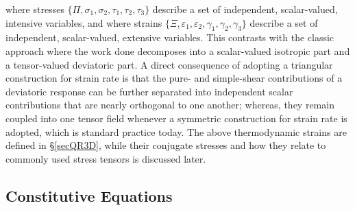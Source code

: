 where stresses $\{ \Pi , \sigma_1 , \sigma_2 , \tau_1 , \tau_2 , \tau_3  \}$ describe a set of independent, scalar-valued, intensive variables, and where strains $\{ \Xi , \varepsilon_1 , \varepsilon_2 , \gamma_1 , \gamma_2 , \gamma_3 \}$ describe a set of independent, scalar-valued, extensive variables.  This contrasts with the classic approach where the work done decomposes into a scalar-valued isotropic part and a tensor-valued deviatoric part.  A direct consequence of adopting a triangular construction for strain rate is that the pure- and simple-shear contributions of a deviatoric response can be further separated into independent scalar contributions that are nearly orthogonal to one another; whereas, they remain coupled into one tensor field whenever a symmetric construction for strain rate is adopted, which is standard practice today.  The above thermo\-dynamic strains are defined in \S\ref{secQR3D}, while their conjugate stresses and how they relate to commonly used stress tensors is discussed later. 

\subsection{Constitutive Equations}

